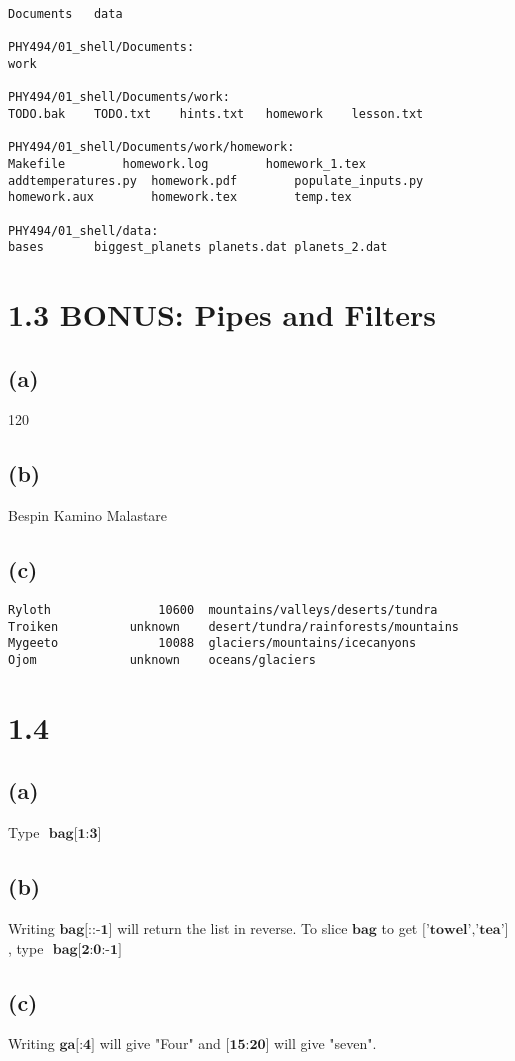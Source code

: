 \begin{verbatim}
Documents	data

PHY494/01_shell/Documents:
work

PHY494/01_shell/Documents/work:
TODO.bak	TODO.txt	hints.txt	homework	lesson.txt

PHY494/01_shell/Documents/work/homework:
Makefile		homework.log		homework_1.tex
addtemperatures.py	homework.pdf		populate_inputs.py
homework.aux		homework.tex		temp.tex

PHY494/01_shell/data:
bases		biggest_planets	planets.dat	planets_2.dat
\end{verbatim}
\section*{1.3 BONUS: Pipes and Filters}
\subsection*{(a)}
120
\subsection*{(b)}
Bespin
Kamino
Malastare
\subsection*{(c)}
\begin{verbatim}
Ryloth               10600  mountains/valleys/deserts/tundra
Troiken          unknown    desert/tundra/rainforests/mountains
Mygeeto              10088  glaciers/mountains/icecanyons
Ojom             unknown    oceans/glaciers
\end{verbatim}
\section*{1.4}
\subsection*{(a)}
Type $\textbf{ bag[1:3]}$
\subsection*{(b)}
Writing $\textbf{bag[::-1]}$ will return the list in reverse. To slice $\textbf{bag}$ to get $\textbf{['towel','tea']}$, type $\textbf{ bag[2:0:-1]}$
\subsection*{(c)}
Writing $\textbf{ga[:4]}$ will give "Four" and $\textbf{[15:20]}$ will give "seven".
